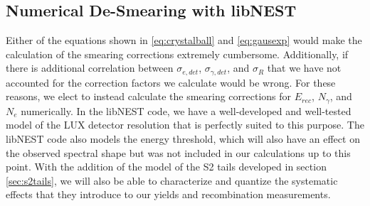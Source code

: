 \subsection{Numerical De-Smearing with libNEST}\label{sec:desmearprelim}
Either of the equations shown in \ref{eq:crystalball} and \ref{eq:gausexp} would make the calculation of the smearing corrections extremely cumbersome. Additionally, if there is additional correlation between $\sigma_{e,det}$, $\sigma_{\gamma,det}$, and $\sigma_{R}$ that we have not accounted for the correction factors we calculate would be wrong. For these reasons, we elect to instead calculate the smearing corrections for $E_{rec}$, $N_{\gamma}$, and $N_{e}$ numerically. In the libNEST code, we have a well-developed and well-tested model of the LUX detector resolution that is perfectly suited to this purpose. The libNEST code also models the energy threshold, which will also have an effect on the observed spectral shape but was not included in our calculations up to this point. With the addition of the model of the S2 tails developed in section \ref{sec:s2tails}, we will also be able to characterize and quantize the systematic effects that they introduce to our yields and recombination measurements.

